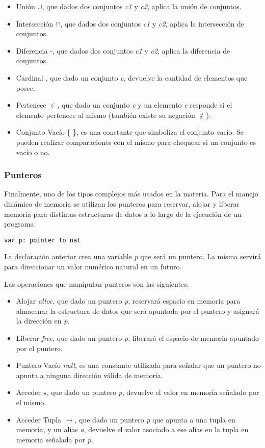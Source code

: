 \documentclass{article}
\newcommand{\card}{\textbar \space \textbar}
\begin{document}
\begin{itemize}
\item Unión $\cup$, que dados dos conjuntos \textit{c1} y \textit{c2}, aplica la unión de conjuntos.
\item Intersección $\cap$, que dados dos conjuntos \textit{c1} y \textit{c2}, aplica la intersección de conjuntos.
\item Diferencia -, que dados dos conjuntos \textit{c1} y \textit{c2}, aplica la diferencia de conjuntos.
\item Cardinal \card, que dado un conjunto \textit{c}, devuelve la cantidad de elementos que posee.
\item Pertenece $\in$, que dado un conjunto \textit{c} y un elemento \textit{e} responde si el elemento pertenece al mismo (también existe su negación $\notin$).
\item Conjunto Vacío \{ \}, es una constante que simboliza el conjunto vacío.
Se pueden realizar comparaciones con el mismo para chequear si un conjunto es vacío o no.
\end{itemize}

\subsubsection{Punteros}
Finalmente, uno de los tipos complejos más usados en la materia.
Para el manejo dinámico de memoria se utilizan los punteros para reservar, alojar y liberar memoria para distintas estructuras de datos a lo largo de la ejecución de un programa.

\begin{lstlisting}
var p: pointer to nat
\end{lstlisting}

La declaración anterior crea una variable \textit{p} que será un puntero.
La misma servirá para direccionar un valor numérico natural en un futuro.

Las operaciones que manipulan punteros son las siguientes:

\begin{itemize}
\item Alojar \textit{alloc}, que dado un puntero \textit{p}, reservará espacio en memoria para almacenar la estructura de datos que será apuntada por el puntero y asignará la dirección en \textit{p}.
\item Liberar \textit{free}, que dado un puntero \textit{p}, liberará el espacio de memoria apuntado por el puntero.
\item Puntero Vacío \textit{null}, es una constante utilizada para señalar que un puntero no apunta a ninguna dirección válida de memoria.
\item Acceder $\star$, que dado un puntero \textit{p}, devuelve el valor en memoria señalado por el mismo.
\item Acceder Tupla $\rightarrow$, que dado un puntero \textit{p} que apunta a una tupla en memoria, y un alias \textit{a}, devuelve el valor asociado a ese alias en la tupla en memoria señalada por \textit{p}.
\end{itemize}
\end{document}
